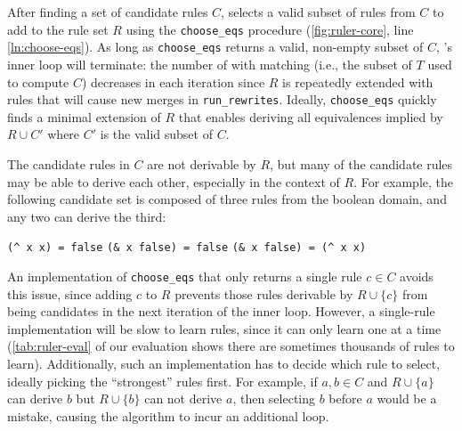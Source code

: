 After finding a set of candidate rules $C$,
   selects a valid subset of rules from $C$
  to add to the rule set $R$
  using the \lstinline{choose_eqs} procedure
  (\autoref{fig:ruler-core}, line \ref{ln:choose-eqs}).
As long as \lstinline{choose_eqs} returns
 a valid, non-empty subset of $C$,
 's inner loop will terminate:
 the number of \eclasses with matching \cvecs
 (i.e., the subset of $T$ used to compute $C$)
 decreases in each iteration since
 $R$ is repeatedly extended with
 rules that will cause new merges
 in \lstinline{run_rewrites}.
Ideally, \lstinline{choose_eqs}
  quickly finds a minimal extension of $R$
  that enables deriving all equivalences
  implied by $R \cup C'$ where $C'$ is
  the valid subset of $C$.


The candidate rules in $C$ are
 not derivable by $R$,
 but many of the
 candidate rules may be able to derive each other,
 especially in the context of $R$.
For example, the following candidate set
 is composed of three rules from the boolean domain,
 and any two can derive the third:

\noindent
\hfill
\lstinline{(^ x x) = false}
\hfill
\lstinline{(& x false) = false}
\hfill
\lstinline{(& x false) = (^ x x)}
\hspace{5em}


An implementation of \lstinline{choose_eqs}
 that only returns a single rule $c \in C$
 avoids this issue,
 since adding $c$ to $R$ prevents
 those rules derivable by $R \cup \{c\}$ from being
 candidates in the next iteration of the inner loop.
However,
 a single-rule implementation
 will be slow to learn rules,
 since it can only learn one at a time
 (\autoref{tab:ruler-eval} of our evaluation shows there are sometimes thousands of rules to learn).
Additionally,
 such an implementation has to decide which rule to select,
 ideally picking the ``strongest'' rules first.
For example,
 if $a,b \in C$ and $R \cup \{a\}$
 can derive $b$ but
 $R \cup \{b\}$
 can not derive $a$,
 then selecting $b$ before $a$ would be a mistake,
 causing the algorithm to incur an additional loop.


